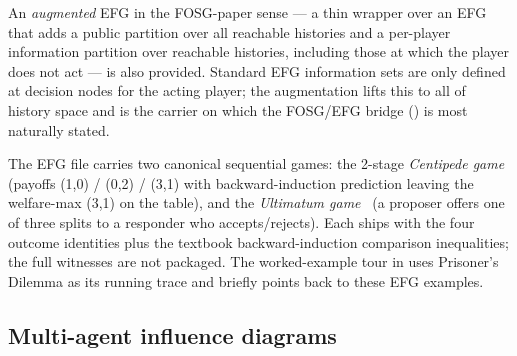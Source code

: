 
An \emph{augmented} EFG in the FOSG-paper sense — a thin wrapper
over an EFG that adds a public partition over all reachable
histories and a per-player information partition over reachable
histories, including those at which the player does not act — is
also provided.  Standard EFG information sets are only defined at
decision nodes for the acting player; the augmentation lifts this
to all of history space and is the carrier on which the FOSG/EFG
bridge () is most naturally stated.

The EFG  file carries two canonical sequential games:
the 2-stage \emph{Centipede game}~\citep{Rosenthal1981} (payoffs
(1,0) / (0,2) / (3,1) with backward-induction prediction 
leaving the welfare-max (3,1) on the table), and the \emph{Ultimatum
game}~\citep{GuthSchmittbergerSchwarze1982} (a proposer offers one of
three splits to a responder who
accepts/rejects). Each ships with the four  outcome
identities plus the textbook backward-induction comparison
inequalities; the full  witnesses are
not packaged.  The worked-example tour in 
uses Prisoner's Dilemma as its running trace and briefly points back
to these EFG examples.


\subsection{Multi-agent influence diagrams}
\label{sec:languages:maid}

